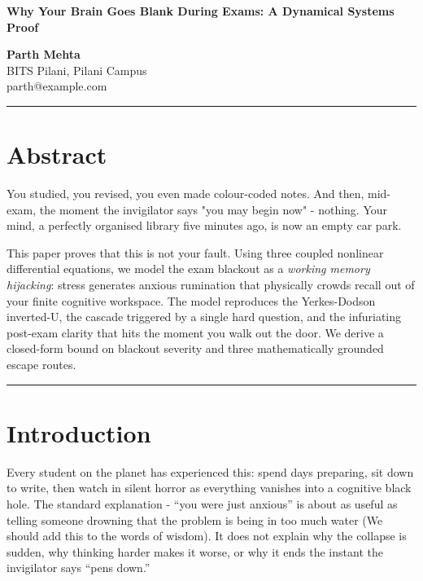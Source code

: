 \documentclass[11pt,a4paper]{article}
\begin{document}
\begin{center}
{\fontsize{13}{15}\selectfont\textbf{%
Why Your Brain Goes Blank During Exams: A Dynamical Systems Proof}}

\vspace{8pt}

{\fontsize{13}{15}\selectfont\textbf{Parth Mehta}}\\[2pt]
{\fontsize{11}{13}\selectfont BITS Pilani, Pilani Campus}\\[2pt]
{\fontsize{11}{13}\selectfont parth@example.com}
\end{center}

\vspace{5pt}\hrule\vspace{5pt}

\section*{Abstract}

You studied, you revised, you even made colour-coded notes. And then,
mid-exam, the moment the invigilator says "you may begin now" - nothing. Your mind, a
perfectly organised library five minutes ago, is now an empty car park.

This paper proves that this is not your fault. Using three coupled
nonlinear differential equations, we model the exam blackout as a
\emph{working memory hijacking}: stress generates anxious rumination
that physically crowds recall out of your finite cognitive workspace.
The model reproduces the Yerkes-Dodson inverted-U, the cascade
triggered by a single hard question, and the infuriating post-exam
clarity that hits the moment you walk out the door. We derive a
closed-form bound on blackout severity and three mathematically
grounded escape routes.

\vspace{4pt}\hrule\vspace{6pt}

\section{Introduction}

Every student on the planet has experienced this: spend days
preparing, sit down to write, then watch in silent horror as
everything vanishes into a cognitive black hole. The standard
explanation - ``you were just anxious'' is about as useful as
telling someone drowning that the problem is being in too much water (We should add this to the words of wisdom).
It does not explain why the collapse is sudden, why thinking harder
makes it worse, or why it ends the instant the invigilator says
``pens down.''
\end{document}
